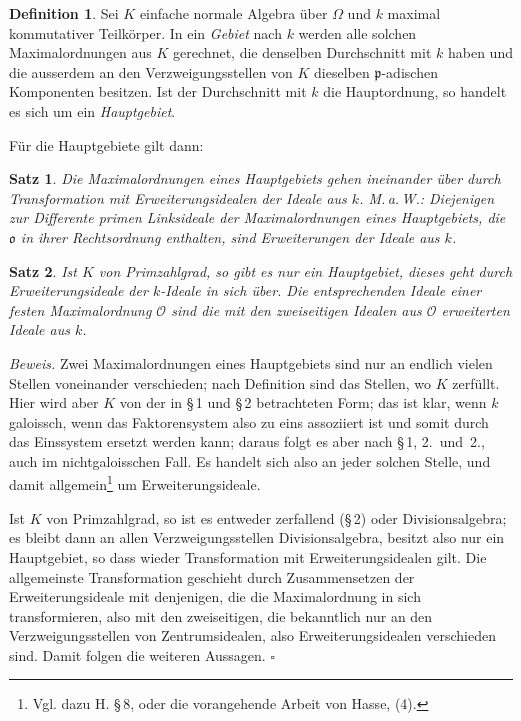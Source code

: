 \documentclass[10pt,a4paper]{article}
\theoremstyle{plain}
\newtheorem{satz}{Satz}[section]
\theoremstyle{definition}
\newtheorem{definition}{Definition}[section]
\theoremstyle{remark}
\newcommand{\ido}{\mathfrak{o}}
\newcommand{\idp}{\mathfrak{p}}
\newcommand{\calO}{\mathcal{O}}
\begin{document}
\begin{definition}
Sei $K$ einfache normale Algebra \"uber $\Omega$ und $k$ maximal kommutativer Teilk\"orper. In ein \emph{Gebiet} nach $k$ werden alle solchen Maximalordnungen aus $K$ gerechnet, die denselben Durchschnitt mit $k$ haben und die ausserdem an den Verzweigungsstellen von $K$ dieselben $\idp$-adischen Komponenten besitzen. Ist der Durchschnitt mit $k$ die Hauptordnung, so handelt es sich um ein \emph{Hauptgebiet}.
\end{definition}

F\"ur die Hauptgebiete gilt dann:

\begin{satz}
Die Maximalordnungen eines Hauptgebiets gehen ineinander \"uber durch Transformation mit Erweiterungsidealen der Ideale aus $k$. M.\,a.\,W.: Diejenigen zur Differente primen Linksideale der Maximalordnungen eines Hauptgebiets, die $\ido$ in ihrer Rechtsordnung enthalten, sind Erweiterungen der Ideale aus $k$.
\end{satz}

\begin{satz}
Ist $K$ von Primzahlgrad, so gibt es nur ein Hauptgebiet, dieses geht durch Erweiterungsideale der $k$-Ideale in sich \"uber. Die entsprechenden Ideale einer festen Maximalordnung $\calO$ sind die mit den zweiseitigen Idealen aus $\calO$ erweiterten Ideale aus $k$.
\end{satz}

\noindent\textit{Beweis.} Zwei Maximalordnungen eines Hauptgebiets sind nur an endlich vielen Stellen voneinander verschieden; nach Definition sind das Stellen, wo $K$ zerf\"ullt. Hier wird aber $K$ von der in \S\,1 und \S\,2 betrachteten Form; das ist klar, wenn $k$ galoissch, wenn das Faktorensystem also zu eins assoziiert ist und somit durch das Einssystem ersetzt werden kann; daraus folgt es aber nach \S\,1, 2.~und~2., auch im nichtgaloisschen Fall. Es handelt sich also an jeder solchen Stelle, und damit allgemein\footnote{Vgl. dazu H. \S\,8, oder die vorangehende Arbeit von Hasse, (4).} um Erweiterungsideale.

Ist $K$ von Primzahlgrad, so ist es entweder zerfallend (\S\,2) oder Divisionsalgebra; es bleibt dann an allen Verzweigungsstellen Divisionsalgebra, besitzt also nur ein Hauptgebiet, so dass wieder Transformation mit Erweiterungsidealen gilt. Die allgemeinste Transformation geschieht durch Zusammensetzen der Erweiterungsideale mit denjenigen, die die Maximalordnung in sich transformieren, also mit den zweiseitigen, die bekanntlich nur an den Verzweigungsstellen von Zentrumsidealen, also Erweiterungsidealen verschieden sind. Damit folgen die weiteren Aussagen. \hfill$\square$
\end{document}
